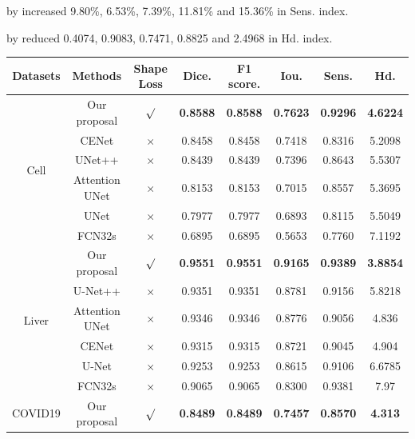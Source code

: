 \documentclass{ieeeaccess}
\begin{document}
  by increased 9.80\%, 6.53\%, 7.39\%, 11.81\% and 15.36\% in Sens. index.
  
  by reduced 0.4074, 0.9083, 0.7471, 0.8825 and 2.4968 in Hd. index. 
  
  \begin{table}[htbp]
  \vspace{-2mm}
  \begin{center}\small
  \label{dataset-table}
  \begin{tabular}{cccccccc}
        
  \toprule
  Datasets & Methods & Shape Loss & Dice. & F1 score. & Iou. & Sens. & Hd.\\
  \midrule
  \multirow{6}{*}{Cell} & Our proposal & $\surd$ & \textbf{0.8588} & \textbf{0.8588} & \textbf{0.7623} & \textbf{0.9296} & \textbf{4.6224}\\
                            & CENet & $\times$ & 0.8458 & 0.8458 & 0.7418 & 0.8316 & 5.2098\\
                            & UNet++ & $\times$ & 0.8439 & 0.8439 & 0.7396 & 0.8643 & 5.5307\\
                            & Attention UNet & $\times$ & 0.8153 & 0.8153 & 0.7015 & 0.8557 & 5.3695\\
                            & UNet  & $\times$  & 0.7977 & 0.7977 & 0.6893 & 0.8115 & 5.5049\\
                            & FCN32s & $\times$ & 0.6895 & 0.6895 & 0.5653 & 0.7760 & 7.1192\\
                            \hline
      \multirow{6}{*}{Liver}   & Our proposal & $\surd$ & \textbf{0.9551} & \textbf{0.9551} & \textbf{0.9165} & \textbf{0.9389} & \textbf{3.8854}\\
                            & U-Net++ & $\times$ & 0.9351 & 0.9351 & 0.8781 & 0.9156 & 5.8218\\
                            & Attention UNet & $\times$ & 0.9346 & 0.9346 & 0.8776 & 0.9056 & 4.836\\
                            & CENet & $\times$ & 0.9315 & 0.9315 & 0.8721 & 0.9045 & 4.904\\
                            & U-Net & $\times$ & 0.9253 & 0.9253 & 0.8615 & 0.9106 & 6.6785\\
                            & FCN32s & $\times$ & 0.9065 & 0.9065 & 0.8300 & 0.9381 & 7.97\\
                            \hline
      \multirow{6}{*}{COVID19} &  Our proposal & $\surd$ & \textbf{0.8489} & \textbf{0.8489} & \textbf{0.7457} & \textbf{0.8570} & \textbf{4.313}\\

\end{tabular}
\end{center}
\end{table}
\end{document}
